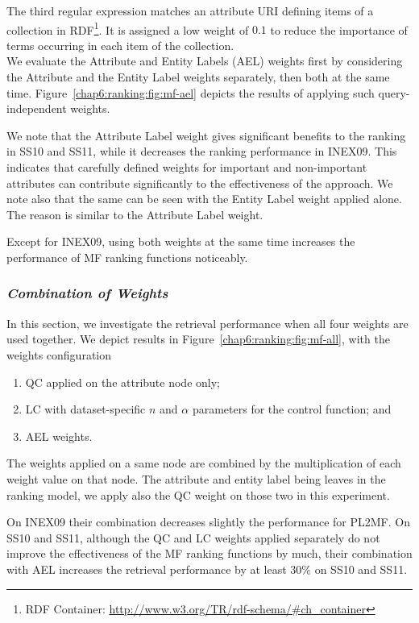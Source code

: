 The third regular expression matches an attribute URI defining items of a collection in RDF\footnote{RDF Container: \url{http://www.w3.org/TR/rdf-schema/\#ch\_container}}. It is assigned a low weight of $0.1$ to reduce the importance of terms occurring in each item of the collection.\\

We evaluate the Attribute and Entity Labels (AEL) weights first by considering the Attribute and the Entity Label weights separately, then both at the same time. Figure~\ref{chap6:ranking:fig:mf-ael} depicts the results of applying such query-independent weights.

We note that the Attribute Label weight gives significant benefits to the ranking in SS10 and SS11, while it decreases the ranking performance in INEX09. This indicates that carefully defined weights for important and non-important attributes can contribute significantly to the effectiveness of the approach. We note also that the same can be seen with the Entity Label weight applied alone. The reason is similar to the Attribute Label weight.

Except for INEX09, using both weights at the same time increases the performance of \gls{MF} ranking functions noticeably.

\subsubsection{\emph{Combination of Weights}}
\label{sec:combi-weight-effect}

In this section, we investigate the retrieval performance when all four weights are used together. We depict results in Figure~\ref{chap6:ranking:fig:mf-all}, with the weights configuration
\begin{enumerate}
    \item QC applied on the attribute node only;
    \item LC with dataset-specific $n$ and $\alpha$ parameters for the control function; and
    \item AEL weights.
\end{enumerate}

The weights applied on a same node are combined by the multiplication of each weight value on that node.
The attribute and entity label being leaves in the ranking model, we apply also the QC weight on those two in this experiment.

On INEX09 their combination decreases slightly the performance for \gls{PL2MF}. On SS10 and SS11, although the QC and LC weights applied separately do not improve the effectiveness of the \gls{MF} ranking functions by much, their combination with AEL increases the retrieval performance by at least $30\%$ on SS10 and SS11.

